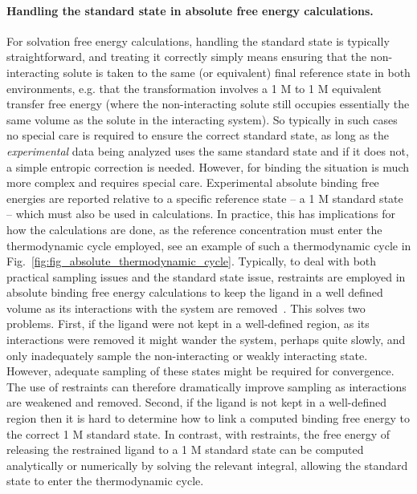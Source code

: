 \documentclass[9pt,bestpractices]{livecoms}
\begin{document}
\paragraph{Handling the standard state in absolute free energy calculations.}
For solvation free energy calculations, handling the standard state is typically straightforward, and treating it correctly simply means ensuring that the non-interacting solute is taken to the same (or equivalent) final reference state in both environments, e.g. that the transformation involves a 1 M to 1 M equivalent transfer free energy (where the non-interacting solute still occupies essentially the same volume as the solute in the interacting system).
So typically in such cases no special care is required to ensure the correct standard state, as long as the \emph{experimental} data being analyzed uses the same standard state and if it does not, a simple entropic correction is needed.
%
However, for binding the situation is much more complex and requires special care.
Experimental absolute binding free energies are reported relative to a specific reference state -- a 1 M standard state -- which must also be used in calculations.
In practice, this has implications for how the calculations are done, as the reference concentration must enter the thermodynamic cycle employed, see an example of such a thermodynamic cycle in Fig.~\ref{fig:fig_absolute_thermodynamic_cycle}.
%
Typically, to deal with both practical sampling issues and the standard state issue, restraints are employed in absolute binding free energy calculations to keep the ligand in a well defined volume as its interactions with the system are removed~\cite{gilson1997statisticalthermodynamic}.
This solves two problems.
First, if the ligand were not kept in a well-defined region, as its interactions were removed it might wander the system, perhaps quite slowly, and only inadequately sample the non-interacting or weakly interacting state.  However, adequate sampling of these states might be required for convergence.
The use of restraints can therefore dramatically improve sampling as interactions are weakened and removed.
Second, if the ligand is not kept in a well-defined region then it is hard to determine how to link a computed binding free energy to the correct 1 M standard state.
In contrast, with restraints, the free energy of releasing the restrained ligand to a 1 M standard state can be computed analytically or numerically by solving the relevant integral, allowing the standard state to enter the thermodynamic cycle.
%
\end{document}

